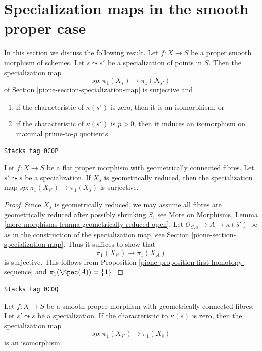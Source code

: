 \section{Specialization maps in the smooth proper case}
\label{pione-section-specialization-smooth-proper}
In this section we discuss the following result.
Let $f : X \to S$ be a proper smooth morphism of schemes.
Let $s \leadsto s'$ be a specialization of points in $S$.
Then the specialization map
$$
sp : \pi_1(X_{\overline{s}}) \longrightarrow \pi_1(X_{\overline{s}'})
$$
of Section \ref{pione-section-specialization-map}
is surjective and
\begin{enumerate}
\item if the characteristic of $\kappa(s')$ is zero, then it is
an isomorphism, or
\item if the characteristic of $\kappa(s')$ is $p > 0$, then it
induces an isomorphism on maximal prime-to-$p$ quotients.
\end{enumerate}

\begin{lemma}
\label{pione-lemma-specialization-map-surjective}
\href{https://stacks.math.columbia.edu/tag/0C0P}{\texttt{Stacks tag 0C0P}}

Let $f : X \to S$ be a flat proper morphism with geometrically
connected fibres. Let $s' \leadsto s$ be a specialization.
If $X_s$ is geometrically reduced, then the specialization
map $sp : \pi_1(X_{\overline{s}'}) \to \pi_1(X_{\overline{s}})$
is surjective.
\end{lemma}

\begin{proof}

Since $X_s$ is geometrically reduced, we may assume all
fibres are geometrically reduced after possibly shrinking $S$, see
More on Morphisms, Lemma \ref{more-morphisms-lemma-geometrically-reduced-open}.
Let $\mathcal{O}_{S, s} \to A \to \kappa(\overline{s}')$ be as
in the construction of the specialization map, see
Section \ref{pione-section-specialization-map}.
Thus it suffices to show that
$$
\pi_1(X_{\overline{s}'}) \to \pi_1(X_A)
$$
is surjective. This follows from
Proposition \ref{pione-proposition-first-homotopy-sequence}
and $\pi_1(\Spec(A)) = \{1\}$.
\end{proof}

\begin{proposition}
\label{pione-proposition-specialization-map-isomorphism}
\href{https://stacks.math.columbia.edu/tag/0C0Q}{\texttt{Stacks tag 0C0Q}}

Let $f : X \to S$ be a smooth proper morphism with geometrically
connected fibres. Let $s' \leadsto s$ be a specialization.
If the characteristic to $\kappa(s)$ is zero, then the specialization
map
$$
sp : \pi_1(X_{\overline{s}'}) \to \pi_1(X_{\overline{s}})
$$
is an isomorphism.
\end{proposition}

